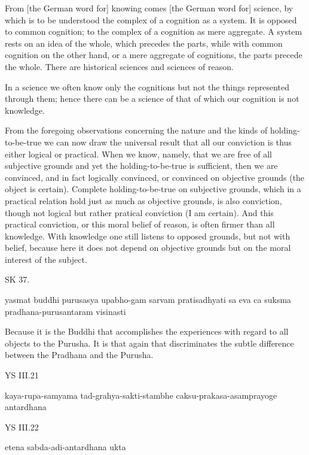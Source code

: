     From [the German word for] knowing comes [the German word for] science,
    by which is to be understood the complex of a cognition as a system.
    It is opposed to common cognition;
    to the complex of a cognition as mere aggregate.
    A system rests on an idea of the whole, which precedes the parts,
    while with common cognition on the other hand,
    or a mere aggregate of cognitions, the parts precede the whole.
    There are historical sciences and sciences of reason.

    In a science we often know only the cognitions
    but not the things represented through them;
    hence there can be a science of that of which
    our cognition is not knowledge.

    From the foregoing observations concerning
    the nature and the kinds of holding-to-be-true
    we can now draw the universal result that
    all our conviction is thus either logical or practical.
    When we know, namely, that we are free of all subjective grounds and
    yet the holding-to-be-true is sufficient,
    then we are convinced, and in fact logically convinced, or
    convinced on objective grounds (the object is certain).
    Complete holding-to-be-true on subjective grounds,
    which in a practical relation hold just as much as objective grounds,
    is also conviction, though not logical but rather pratical conviction (I am certain).
    And this practical conviction, or this moral belief of reason,
    is often firmer than all knowledge.
    With knowledge one still listens to opposed grounds,
    but not with belief, because here it does not depend
    on objective grounds but on the moral interest of the subject.

SK 37.

yasmat buddhi purusasya upabho-gam sarvam pratisadhyati
sa eva ca suksma pradhana-purusantaram visinasti

Because it is the Buddhi that accomplishes the experiences
with regard to all objects to the Purusha.
It is that again that discriminates the subtle difference
between the Pradhana and the Purusha.

YS III.21

    kaya-rupa-samyama tad-grahya-sakti-stambhe
    caksu-prakasa-asamprayoge antardhana

YS III.22

    etena sabda-adi-antardhana ukta
